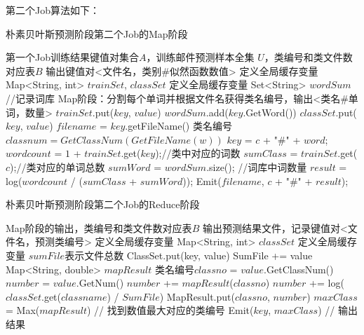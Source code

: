 \documentclass[lang=cn,11pt]{elegantpaper}
\begin{document}
第二个Job算法如下：

\begin{algorithm}[!htb]
  \caption{朴素贝叶斯预测阶段第二个Job的Map阶段}
  \label{alg:Framwork}
  \begin{algorithmic}[1]
    \Require
    第一个Job训练结果键值对集合$A$，训练邮件预测样本全集 $U$，类编号和类文件数对应表$B$
    \Ensure
    输出键值对<文件名，类别\#似然函数数值>
  \State 定义全局缓存变量 Map<String, int> $trainSet$, $classSet$
  \State 定义全局缓存变量 Set<String> $wordSum$    //记录词库
  \State Map阶段：分割每个单词并根据文件名获得类名编号，输出<类名\#单词，数量>
      \State $trainSet$.put($key$, $value$)
      \State $wordSum$.add($key$.GetWord())
    \EndFor
      \State $classSet$.put($key$, $value$)
    \EndFor
  \EndFunction
    \State $filename$ = $key$.getFileName()
      \State 类名编号$classnum = GetClassNum(GetFileName(w))$
        \State $key$ = $c$ + "\#" + $word$;
        \State $wordcount$ = $1$ + $trainSet$.get($key$);//类中对应的词数
        \State $sumClass$ = $trainSet$.get($c$);//类对应的单词总数
        \State $sumWord$ = $wordSum$.size(); //词库中词数量
        \State $result$ = log($wordcount$ / ($sumClass$ + $sumWord$));
        \State Emit($filename$, $c$ + "\#" + $result$);
   		\EndFor
   \EndFor
  \EndFunction
	\end{algorithmic}
\end{algorithm}

\begin{algorithm}[!htb]
  \caption{朴素贝叶斯预测阶段第二个Job的Reduce阶段}
  \label{alg:Framwork}
  \begin{algorithmic}[1]
    \Require
    Map阶段的输出，类编号和类文件数对应表$B$
    \Ensure
    输出预测结果文件，记录键值对<文件名，预测类编号>
  \State 定义全局缓存变量 Map<String, int> $classSet$
  \State 定义全局缓存变量 $sumFile$表示文件总数
      \State ClassSet.put(key, value)
      \State SumFile += value
    \EndFor
  \EndFunction
    \State Map<String, double> $mapResult$
        \State 类名编号$classno$ = $value$.GetClassNum()
        \State $number$ = $value$.GetNum()
          \State $number$ += $mapResult$($classno$)
        \Else
          \State $number$ += log($classSet$.get($classname$) / $SumFile$)
        \EndIf  
        \State MapResult.put($classno$, $number$)
    \EndFor
    \State $maxClass$ = Max($mapResult$) // 找到数值最大对应的类编号
    \State Emit($key$, $maxClass$) // 输出结果
  \EndFunction
  \end{algorithmic}
\end{algorithm}
\end{document}

